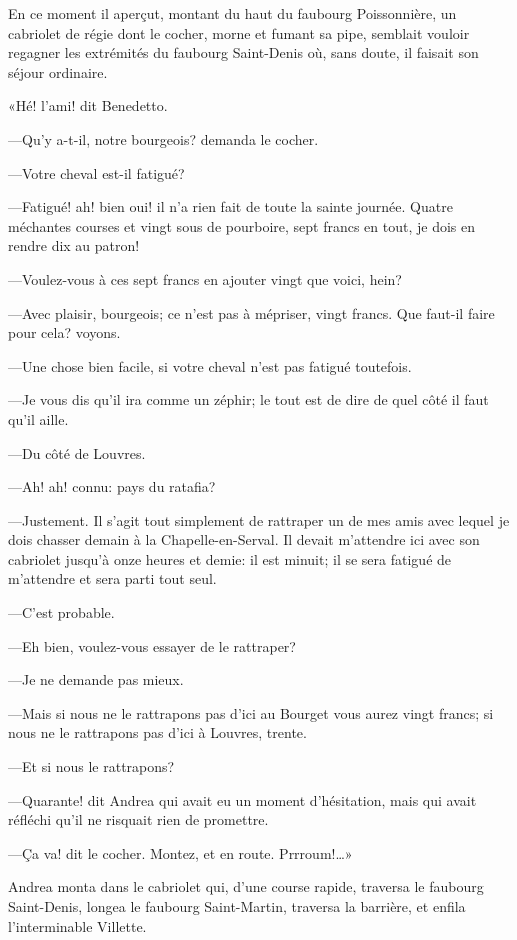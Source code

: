 En ce moment il aperçut, montant du haut du faubourg Poissonnière, un cabriolet de régie dont le cocher, morne et fumant sa pipe, semblait vouloir regagner les extrémités du faubourg Saint-Denis où, sans doute, il faisait son séjour ordinaire. 

«Hé! l'ami! dit Benedetto. 

—Qu'y a-t-il, notre bourgeois? demanda le cocher. 

—Votre cheval est-il fatigué? 

—Fatigué! ah! bien oui! il n'a rien fait de toute la sainte journée. Quatre méchantes courses et vingt sous de pourboire, sept francs en tout, je dois en rendre dix au patron! 

—Voulez-vous à ces sept francs en ajouter vingt que voici, hein? 

—Avec plaisir, bourgeois; ce n'est pas à mépriser, vingt francs. Que faut-il faire pour cela? voyons. 

—Une chose bien facile, si votre cheval n'est pas fatigué toutefois. 

—Je vous dis qu'il ira comme un zéphir; le tout est de dire de quel côté il faut qu'il aille. 

—Du côté de Louvres. 

—Ah! ah! connu: pays du ratafia? 

—Justement. Il s'agit tout simplement de rattraper un de mes amis avec lequel je dois chasser demain à la Chapelle-en-Serval. Il devait m'attendre ici avec son cabriolet jusqu'à onze heures et demie: il est minuit; il se sera fatigué de m'attendre et sera parti tout seul. 

—C'est probable. 

—Eh bien, voulez-vous essayer de le rattraper? 

—Je ne demande pas mieux. 

—Mais si nous ne le rattrapons pas d'ici au Bourget vous aurez vingt francs; si nous ne le rattrapons pas d'ici à Louvres, trente. 

—Et si nous le rattrapons? 

—Quarante! dit Andrea qui avait eu un moment d'hésitation, mais qui avait réfléchi qu'il ne risquait rien de promettre. 

—Ça va! dit le cocher. Montez, et en route. Prrroum!\dots» 

Andrea monta dans le cabriolet qui, d'une course rapide, traversa le faubourg Saint-Denis, longea le faubourg Saint-Martin, traversa la barrière, et enfila l'interminable Villette. 

